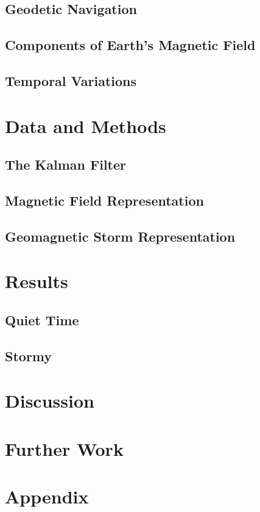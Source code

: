 \documentclass[conf]{new-aiaa}
\begin{document}
\subsection{Geodetic Navigation}

\subsection{Components of Earth's Magnetic Field}

\subsection{Temporal Variations}

\section{Data and Methods}

\subsection{The Kalman Filter}

\subsection{Magnetic Field Representation}

\subsection{Geomagnetic Storm Representation}

\section{Results}

\subsection{Quiet Time}

\subsection{Stormy}

\section{Discussion}

\section{Further Work}

\section*{Appendix}


\end{document}
